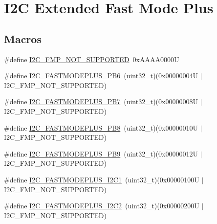 \hypertarget{group___i2_c_ex___fast_mode_plus}{}\section{I2C Extended Fast Mode Plus}
\label{group___i2_c_ex___fast_mode_plus}
\subsection*{Macros}
\begin{DoxyCompactItemize}
\item 
\#define \mbox{\hyperlink{group___i2_c_ex___fast_mode_plus_ga3a3da061fa78faa209f0feb39e20ef43}{I2\+C\+\_\+\+F\+M\+P\+\_\+\+N\+O\+T\+\_\+\+S\+U\+P\+P\+O\+R\+T\+ED}}~0x\+A\+A\+A\+A0000U
\item 
\#define \mbox{\hyperlink{group___i2_c_ex___fast_mode_plus_ga9b3b77b0f00f09ee6d272d70dd5663f5}{I2\+C\+\_\+\+F\+A\+S\+T\+M\+O\+D\+E\+P\+L\+U\+S\+\_\+\+P\+B6}}~(uint32\+\_\+t)(0x00000004\+U $\vert$ I2\+C\+\_\+\+F\+M\+P\+\_\+\+N\+O\+T\+\_\+\+S\+U\+P\+P\+O\+R\+T\+E\+D)
\item 
\#define \mbox{\hyperlink{group___i2_c_ex___fast_mode_plus_gaaa6d3f6c1d635a2f5e4dbe2ef66ce1c3}{I2\+C\+\_\+\+F\+A\+S\+T\+M\+O\+D\+E\+P\+L\+U\+S\+\_\+\+P\+B7}}~(uint32\+\_\+t)(0x00000008\+U $\vert$ I2\+C\+\_\+\+F\+M\+P\+\_\+\+N\+O\+T\+\_\+\+S\+U\+P\+P\+O\+R\+T\+E\+D)
\item 
\#define \mbox{\hyperlink{group___i2_c_ex___fast_mode_plus_gaf8d6aa219f041b552b3d3cd53cb78a26}{I2\+C\+\_\+\+F\+A\+S\+T\+M\+O\+D\+E\+P\+L\+U\+S\+\_\+\+P\+B8}}~(uint32\+\_\+t)(0x00000010\+U $\vert$ I2\+C\+\_\+\+F\+M\+P\+\_\+\+N\+O\+T\+\_\+\+S\+U\+P\+P\+O\+R\+T\+E\+D)
\item 
\#define \mbox{\hyperlink{group___i2_c_ex___fast_mode_plus_gafab6e63d100bf337bf9f0bf6a607636d}{I2\+C\+\_\+\+F\+A\+S\+T\+M\+O\+D\+E\+P\+L\+U\+S\+\_\+\+P\+B9}}~(uint32\+\_\+t)(0x00000012\+U $\vert$ I2\+C\+\_\+\+F\+M\+P\+\_\+\+N\+O\+T\+\_\+\+S\+U\+P\+P\+O\+R\+T\+E\+D)
\item 
\#define \mbox{\hyperlink{group___i2_c_ex___fast_mode_plus_ga3a8064ecfa3b33115f62123f7162770e}{I2\+C\+\_\+\+F\+A\+S\+T\+M\+O\+D\+E\+P\+L\+U\+S\+\_\+\+I2\+C1}}~(uint32\+\_\+t)(0x00000100\+U $\vert$ I2\+C\+\_\+\+F\+M\+P\+\_\+\+N\+O\+T\+\_\+\+S\+U\+P\+P\+O\+R\+T\+E\+D)
\item 
\#define \mbox{\hyperlink{group___i2_c_ex___fast_mode_plus_gaa5c33513afa036a6f97e9cbf2d61f4b2}{I2\+C\+\_\+\+F\+A\+S\+T\+M\+O\+D\+E\+P\+L\+U\+S\+\_\+\+I2\+C2}}~(uint32\+\_\+t)(0x00000200\+U $\vert$ I2\+C\+\_\+\+F\+M\+P\+\_\+\+N\+O\+T\+\_\+\+S\+U\+P\+P\+O\+R\+T\+E\+D)

\end{DoxyCompactItemize}
